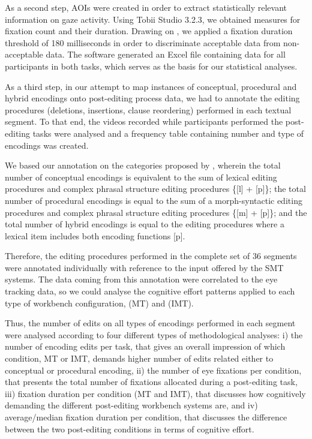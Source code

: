 \documentclass[output=paper]{langsci/langscibook}
\begin{document}
As a second step, AOIs were created in order to extract statistically relevant information on gaze activity. Using Tobii Studio 3.2.3, we obtained measures for fixation count and their duration. Drawing on \citet[105]{Sjorup2013}, we applied a fixation duration threshold of 180 milliseconds in order to discriminate acceptable data from non-acceptable data. The software generated an Excel file containing data for all participants in both tasks, which serves as the basis for our statistical analyses.



As a third step, in our attempt to map instances of conceptual, procedural and hybrid encodings onto post-editing process data, we had to annotate the editing procedures (deletions, insertions, clause reordering) performed in each textual segment. To that end, the videos recorded while participants performed the post-editing tasks were analysed and a frequency table containing number and type of encodings was created. 



We based our annotation on the categories proposed by \citet{alves2013}, wherein the total number of conceptual encodings is equivalent to the sum of lexical editing procedures and complex phrasal structure editing procedures \{[l] + [p]\}; the total number of procedural encodings is equal to the sum of a morph-syntactic editing procedures and complex phrasal structure editing procedures \{[m] + [p]\}; and the total number of hybrid encodings is equal to the editing procedures where a lexical item includes both encoding functions [p]. 



Therefore, the editing procedures performed in the complete set of 36 segments were annotated individually with reference to the input offered by the SMT systems.  The data coming from this annotation were correlated to the eye tracking data, so we could analyse the cognitive effort patterns applied to each type of workbench configuration, (MT) and (IMT). 



Thus, the number of edits on all types of encodings performed in each segment were analysed according to four different types of methodological analyses: i) the number of encoding edits per task, that gives an overall impression of which condition, MT or IMT, demands higher number of  edits related either to conceptual or procedural encoding, ii) the number of eye fixations per condition, that presents the total number of fixations allocated during a post-editing task, iii) fixation duration per condition (MT and IMT), that discusses how cognitively demanding the different post-editing workbench systems are, and iv) average/median fixation duration per condition, that discusses the difference between the two post-editing conditions in terms of cognitive effort.   
\end{document}
